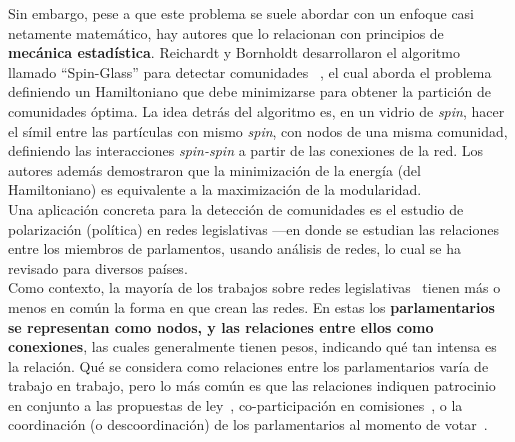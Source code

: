 \documentclass[hyperref]{proyectotesis}
\begin{document}
Sin embargo, pese a que este problema se suele abordar con un enfoque casi netamente matemático, hay autores que lo relacionan con principios de \textbf{mecánica estadística}. Reichardt y Bornholdt desarrollaron el algoritmo llamado ``Spin-Glass'' para detectar comunidades ~\cite{reichardt_statistical_2006}, el cual aborda el problema definiendo un Hamiltoniano que debe minimizarse para obtener la partición de comunidades óptima. La idea detrás del algoritmo es, en un vidrio de \textit{spin}, hacer el símil entre las partículas con mismo \textit{spin}, con nodos de una misma comunidad, definiendo las interacciones \textit{spin-spin} a partir de las conexiones de la red. Los autores además demostraron que la minimización de la energía (del Hamiltoniano) es equivalente a la maximización de la modularidad.\\

Una aplicación concreta para la detección de comunidades es el estudio de polarización (política) en redes legislativas ---en donde se estudian las relaciones entre los miembros de parlamentos, usando análisis de redes, lo cual se ha revisado para diversos países.\\

Como contexto, la mayoría de los trabajos sobre redes legislativas~\cite{neal_sign_2020, marenco_time_2020, intal_dissent_2021, schoch_legislators_2020, aleman_explaining_2013, zhang_community_2007, fowler_connecting_2007, porter_network_2005, andris_rise_2015, briatte_network_2016, le_foulon_moran_cooperation_2020}
tienen más o menos en común la forma en que crean las redes. En estas los \textbf{parlamentarios se representan como nodos, y las relaciones entre ellos como conexiones}, las cuales generalmente tienen pesos, indicando qué tan intensa es la relación. Qué se considera como relaciones entre los parlamentarios varía de trabajo en trabajo, pero lo más común es que las relaciones indiquen patrocinio en conjunto a las propuestas de ley~\cite{neal_sign_2020, zhang_community_2007, le_foulon_moran_cooperation_2020,fowler_connecting_2007}, co-participación en comisiones~\cite{porter_network_2005}, o la coordinación (o descoordinación) de los parlamentarios al momento de votar~\cite{andris_rise_2015, marenco_time_2020, schoch_legislators_2020, intal_dissent_2021}.\\
\end{document}
